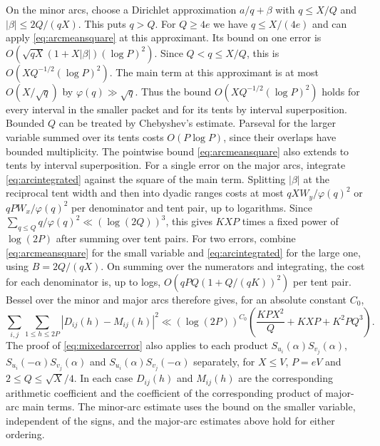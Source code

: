 \documentclass[11pt,a4paper]{article}
\numberwithin{equation}{section}
\begin{document}
On the minor arcs, choose a Dirichlet approximation $a/q+\beta$
with $q\le X/Q$ and $|\beta|\le 2Q/(qX)$. This puts $q>Q$.
For $Q\ge 4e$ we have $q\le X/(4e)$ and can apply
\cref{eq:arcmeansquare} at this approximant. Its bound on
one error is $O(\sqrt{qX}(1+X|\beta|)(\log P)^2)$.
Since $Q<q\le X/Q$, this is $O(XQ^{-1/2}(\log P)^2)$.
The main term at this approximant is at most $O(X/\sqrt q)$
by $\varphi(q)\gg\sqrt q$. Thus the bound
$O(XQ^{-1/2}(\log P)^2)$ holds for every interval in the
smaller packet and for its tents by interval superposition.
Bounded $Q$ can be treated by Chebyshev's estimate.
Parseval for the larger variable summed over its tents costs
$O(P\log P)$, since their overlaps have bounded multiplicity.
The pointwise bound \cref{eq:arcmeansquare} also extends
to tents by interval superposition. For a single error on
the major arcs, integrate \cref{eq:arcintegrated} against
the square of the main term. Splitting $|\beta|$ at the
reciprocal tent width and then into dyadic ranges costs at
most $q X W_y/\varphi(q)^2$ or $q P W_x/\varphi(q)^2$ per
denominator and tent pair, up to logarithms. Since
$\sum_{q\le Q}q/\varphi(q)^2\ll(\log(2Q))^3$, this gives
$KXP$ times a fixed power of $\log(2P)$ after summing over
tent pairs. For two errors, combine
\cref{eq:arcmeansquare} for the small variable and
\cref{eq:arcintegrated} for the large one, using
$B=2Q/(qX)$. On summing over the numerators and integrating,
the cost for each denominator is, up to logs,
$O(qP Q(1+Q/(qK))^2)$ per tent pair.
Bessel over the minor and major arcs therefore gives, for
an absolute constant $C_0$,
\begin{equation}
 \sum_{i,j}\sum_{1\le h\le2P}|D_{ij}(h)-M_{ij}(h)|^2
 \ll (\log(2P))^{C_0}
   \left(\frac{KP X^2}{Q}+KXP+K^2P Q^3\right).
 \label{eq:mixedarcerror}
\end{equation}
The proof of \cref{eq:mixedarcerror} also applies to each
product $S_{u_i}(\alpha)S_{v_j}(\alpha)$,
$S_{u_i}(-\alpha)S_{v_j}(\alpha)$ and
$S_{u_i}(\alpha)S_{v_j}(-\alpha)$ separately, for
$X\le V$, $P=eV$ and $2\le Q\le\sqrt X/4$.
In each case $D_{ij}(h)$ and $M_{ij}(h)$ are the corresponding
arithmetic coefficient and the coefficient of the corresponding
product of major-arc main terms. The minor-arc estimate uses
the bound on the smaller variable, independent of the signs,
and the major-arc estimates above hold for either ordering.
\end{document}
